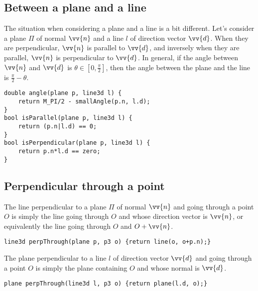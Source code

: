 \subsection{Between a plane and a line}
The situation when considering a plane and a line is a bit different.
Let's consider a plane $\Pi$ of normal $\vv{n}$ and a line $l$ of direction vector $\vv{d}$.
When they are perpendicular, $\vv{n}$ is parallel to $\vv{d}$, and inversely when they are parallel, $\vv{n}$ is perpendicular to $\vv{d}$. In general, if the angle between $\vv{n}$ and $\vv{d}$ is $\theta \in [0,\frac{\pi}{2}]$, then the angle between the plane and the line is $\frac{\pi}{2}-\theta$.


\begin{lstlisting}
double angle(plane p, line3d l) {
    return M_PI/2 - smallAngle(p.n, l.d);
}
bool isParallel(plane p, line3d l) {
    return (p.n|l.d) == 0;
}
bool isPerpendicular(plane p, line3d l) {
    return p.n*l.d == zero;
}
\end{lstlisting}

\subsection{Perpendicular through a point}
The line perpendicular to a plane $\Pi$ of normal $\vv{n}$ and going through a point $O$ is simply the line going through $O$ and whose direction vector is $\vv{n}$, or equivalently the line going through $O$ and $O+\vv{n}$.



\begin{lstlisting}
line3d perpThrough(plane p, p3 o) {return line(o, o+p.n);}
\end{lstlisting}

The plane perpendicular to a line $l$ of direction vector $\vv{d}$ and going through a point $O$ is simply the plane containing $O$ and whose normal is $\vv{d}$.


\begin{lstlisting}
plane perpThrough(line3d l, p3 o) {return plane(l.d, o);}
\end{lstlisting}
